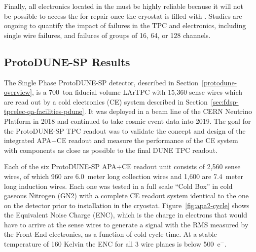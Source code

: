 Finally, all electronics located in the \lar must 
be highly reliable because it will not be possible to access the  for repair once the cryostat is filled with \lar. Studies are ongoing to quantify the impact of failures in the TPC and electronics, including single wire failures, and failures of groups of \num{16}, \num{64}, or \num{128} channels.


\subsection{ProtoDUNE-SP Results}
\label{sec:fdsp-tpcelec-overview-pdune}


The Single Phase ProtoDUNE-SP detector, described in Section~\ref{protodune-overview}, is a 700~ton fiducial volume LArTPC with 15,360 sense wires which are read out by a cold electronics (CE) system described in Section~\ref{sec:fdsp-tpcelec-qa-facilities-pdune}. It was deployed in a beam line of the CERN Neutrino Platform in 2018 and continued to take cosmic event data into 2019. The goal for the ProtoDUNE-SP TPC readout was to validate the concept and design of the integrated APA+CE readout and measure the performance of the CE system with components as close as possible to the final DUNE TPC readout.

Each of the six ProtoDUNE-SP APA+CE readout unit consists of 2,560 sense wires, of which 960 are 6.0~meter long collection wires and 1,600 are 7.4~meter long induction wires. Each one was tested in a full scale ``Cold Box'' in cold gaseous Nitrogen (GN2) with a complete CE readout system identical to the one on the detector prior to installation in the cryostat. Figure~\ref{fig:apa2-cycle} shows the Equivalent Noise Charge (ENC), which is the charge in electrons that would have to arrive at the sense wires to generate a signal with the RMS measured by the Front-End electronics, as a function of cold cycle time. At a stable temperature of 160 Kelvin the ENC for all 3 wire planes is below 500~e$^-$.

